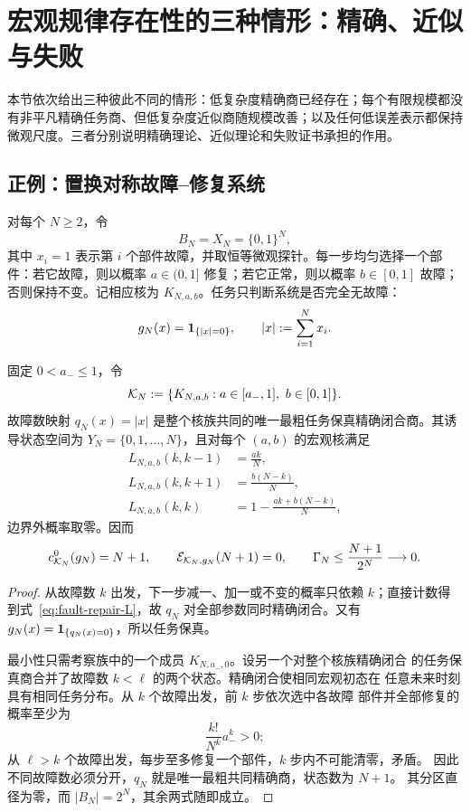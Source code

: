 \section{宏观规律存在性的三种情形：精确、近似与失败}
\label{sec:fault-repair}

本节依次给出三种彼此不同的情形：低复杂度精确商已经存在；每个有限规模都没有非平凡精确任务商、但低复杂度近似商随规模改善；以及任何低误差表示都保持微观尺度。三者分别说明精确理论、近似理论和失败证书承担的作用。

\subsection{正例：置换对称故障--修复系统}

对每个 $N\ge2$，令
\[
B_N=X_N=\{0,1\}^N,
\]
其中 $x_i=1$ 表示第 $i$ 个部件故障，并取恒等微观探针。每一步均匀选择一个部件：若它故障，则以概率 $a\in(0,1]$ 修复；若它正常，则以概率 $b\in[0,1]$ 故障；否则保持不变。记相应核为 $K_{N,a,b}$。任务只判断系统是否完全无故障：
\[
g_N(x)=\mathbf 1_{\{|x|=0\}},
\qquad |x|:=\sum_{i=1}^N x_i.
\]

\begin{theorem}[故障数商的精确闭合与最小性]
\label{thm:fault-repair}
固定 $0<a_-\le1$，令
\[
\cK_N:=\{K_{N,a,b}:a\in[a_-,1],\ b\in[0,1]\}.
\]
故障数映射 $q_N(x)=|x|$ 是整个核族共同的唯一最粗任务保真精确闭合商。其诱导状态空间为 $Y_N=\{0,1,\ldots,N\}$，且对每个 $(a,b)$ 的宏观核满足
\begin{align}
L_{N,a,b}(k,k-1)&=\frac{ak}{N},\nonumber\\
L_{N,a,b}(k,k+1)&=\frac{b(N-k)}{N},\label{eq:fault-repair-L}\\
L_{N,a,b}(k,k)&=1-\frac{ak+b(N-k)}{N},\nonumber
\end{align}
边界外概率取零。因而
\begin{equation}
c^0_{\mathcal K_N}(g_N)=N+1,
\qquad
\mathcal E_{\mathcal K_N,g_N}(N+1)=0,
\qquad
\Gamma_N\le\frac{N+1}{2^N}\longrightarrow0.
\label{eq:fault-repair-three-levels}
\end{equation}
\end{theorem}

\begin{proof}
从故障数 $k$ 出发，下一步减一、加一或不变的概率只依赖 $k$；直接计数得到式~\eqref{eq:fault-repair-L}，故 $q_N$ 对全部参数同时精确闭合。又有 $g_N(x)=\mathbf 1_{\{q_N(x)=0\}}$，所以任务保真。

最小性只需考察族中的一个成员 $K_{N,a_-,0}$。设另一个对整个核族精确闭合
的任务保真商合并了故障数 $k<\ell$ 的两个状态。精确闭合使相同宏观初态在
任意未来时刻具有相同任务分布。从 $k$ 个故障出发，前 $k$ 步依次选中各故障
部件并全部修复的概率至少为
\[
\frac{k!}{N^k}a_-^k>0;
\]
从 $\ell>k$ 个故障出发，每步至多修复一个部件，$k$ 步内不可能清零，矛盾。
因此不同故障数必须分开，$q_N$ 就是唯一最粗共同精确商，状态数为 $N+1$。
其分区直径为零，而 $|B_N|=2^N$，其余两式随即成立。
\end{proof}

